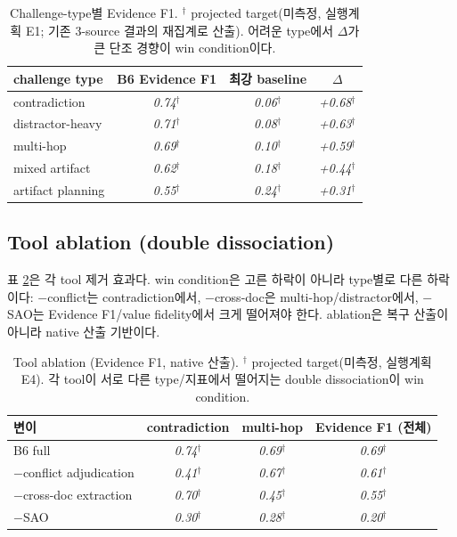 \documentclass[11pt]{article}
\newcommand{\proj}[1]{\textit{#1}$^\dagger$} %
\begin{document}
\begin{table}[h]
\centering\small
\begin{tabular}{lccc}
\toprule
challenge type & B6 Evidence F1 & 최강 baseline & $\Delta$ \\
\midrule
contradiction     & \proj{0.74} & \proj{0.06} & \proj{+0.68} \\
distractor-heavy  & \proj{0.71} & \proj{0.08} & \proj{+0.63} \\
multi-hop         & \proj{0.69} & \proj{0.10} & \proj{+0.59} \\
mixed artifact    & \proj{0.62} & \proj{0.18} & \proj{+0.44} \\
artifact planning & \proj{0.55} & \proj{0.24} & \proj{+0.31} \\
\bottomrule
\end{tabular}
\caption{Challenge-type별 Evidence F1. $^\dagger$ projected target(미측정, 실행계획 E1; 기존
3-source 결과의 재집계로 산출). 어려운 type에서 $\Delta$가 큰 단조 경향이 win condition이다.}
\label{tab:bytype}
\end{table}

\subsection{Tool ablation (double dissociation)}
표 \ref{tab:ablation}은 각 tool 제거 효과다. win condition은 고른 하락이 아니라 type별로 다른
하락이다: $-$conflict는 contradiction에서, $-$cross-doc은 multi-hop/distractor에서, $-$SAO는
Evidence F1/value fidelity에서 크게 떨어져야 한다. ablation은 복구 산출이 아니라 native 산출
기반이다.

\begin{table}[h]
\centering\small
\begin{tabular}{lccc}
\toprule
변이 & contradiction & multi-hop & Evidence F1 (전체) \\
\midrule
B6 full & \proj{0.74} & \proj{0.69} & \proj{0.69} \\
$-$conflict adjudication & \proj{0.41} & \proj{0.67} & \proj{0.61} \\
$-$cross-doc extraction & \proj{0.70} & \proj{0.45} & \proj{0.55} \\
$-$SAO & \proj{0.30} & \proj{0.28} & \proj{0.20} \\
\bottomrule
\end{tabular}
\caption{Tool ablation (Evidence F1, native 산출). $^\dagger$ projected target(미측정, 실행계획
E4). 각 tool이 서로 다른 type/지표에서 떨어지는 double dissociation이 win condition.}
\label{tab:ablation}
\end{table}
\end{document}

